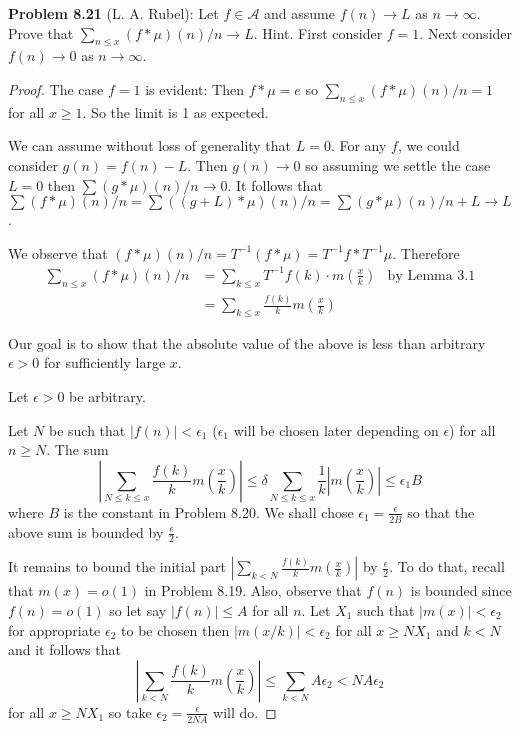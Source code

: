 \documentclass[12pt]{article}
\newcommand{\A}{\mathcal{A}}
\newcommand{\Abs}[1]{\left| #1 \right|}
\begin{document}
\textbf{Problem 8.21} (L. A. Rubel): Let $f \in \A$ and assume $f(n) \rightarrow L$ as $n \rightarrow \infty$. Prove that $\sum_{n \leq x} (f * \mu)(n) / n \rightarrow L$. Hint. First consider $f = 1$. Next consider $f(n) \rightarrow 0$ as $n \rightarrow \infty$.

\begin{proof}
The case $f = 1$ is evident: Then $f * \mu = e$ so $\sum_{n \leq x} (f * \mu)(n)/n = 1$ for all $x \geq 1$. So the limit is 1 as expected.

We can assume without loss of generality that $L = 0$. For any $f$, we could consider $g(n) = f(n) - L$. Then $g(n) \rightarrow 0$ so assuming we settle the case $L = 0$ then $\sum (g * \mu)(n)/n \rightarrow 0$. It follows that $\sum (f * \mu)(n)/n = \sum ((g + L) * \mu)(n)/n = \sum (g * \mu)(n)/n + L \rightarrow L$.

We observe that $(f * \mu)(n)/n = T^{-1}(f * \mu) = T^{-1}f * T^{-1}\mu$. Therefore
\begin{align*}
\sum_{n \leq x} (f * \mu)(n) / n &= \sum_{k \leq x} T^{-1}f(k) \cdot m\left(\frac{x}{k}\right) &\text{by Lemma 3.1}\\
&= \sum_{k \leq x} \frac{f(k)}{k} m\left(\frac{x}{k}\right)
\end{align*}

Our goal is to show that the absolute value of the above is less than arbitrary $\epsilon > 0$ for sufficiently large $x$.

Let $\epsilon > 0$ be arbitrary.

Let $N$ be such that $|f(n)| < \epsilon_1$ ($\epsilon_1$ will be chosen later depending on $\epsilon$) for all $n \geq N$. The sum
$$\Abs{ \sum_{N \leq k \leq x} \frac{f(k)}{k} m\left(\frac{x}{k}\right) } \leq \delta \sum_{N \leq k \leq x} \frac{1}{k} \Abs{m\left(\frac{x}{k}\right)} \leq \epsilon_1 B$$
where $B$ is the constant in Problem 8.20. We shall chose $\epsilon_1 = \frac{\epsilon}{2B}$ so that the above sum is bounded by $\frac{\epsilon}{2}$.

It remains to bound the initial part $\Abs{ \sum_{k < N} \frac{f(k)}{k} m\left(\frac{x}{k}\right) }$ by $\frac{\epsilon}{2}$. To do that, recall that $m(x) = o(1)$ in Problem 8.19. Also, observe that $f(n)$ is bounded since $f(n) = o(1)$ so let say $|f(n)| \leq A$ for all $n$. Let $X_1$ such that $|m(x)| < \epsilon_2$ for appropriate $\epsilon_2$ to be chosen then $|m(x/k)| < \epsilon_2$ for all $x \geq N X_1$ and $k < N$ and it follows that
$$\Abs{ \sum_{k < N} \frac{f(k)}{k} m\left(\frac{x}{k}\right) } \leq \sum_{k < N} A \epsilon_2 < N A \epsilon_2$$
for all $x \geq N X_1$ so take $\epsilon_2 = \frac{\epsilon}{2NA}$ will do.


\end{proof}
\end{document}
